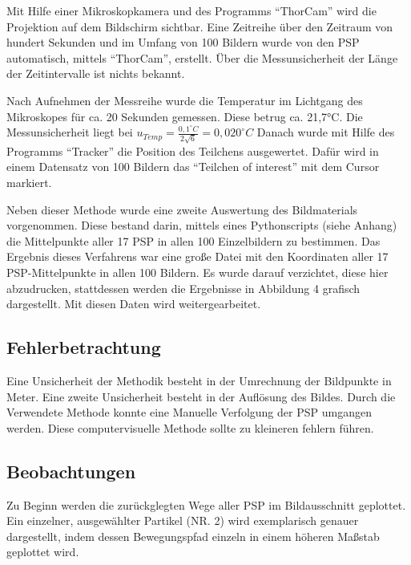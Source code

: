 \documentclass[
  9pt,
]{article}
\begin{document}
Mit Hilfe einer Mikroskopkamera und des Programms ``ThorCam'' wird die
Projektion auf dem Bildschirm sichtbar. Eine Zeitreihe über den Zeitraum
von hundert Sekunden und im Umfang von 100 Bildern wurde von den PSP
automatisch, mittels ``ThorCam'', erstellt. Über die Messunsicherheit
der Länge der Zeitintervalle ist nichts bekannt.

Nach Aufnehmen der Messreihe wurde die Temperatur im Lichtgang des
Mikroskopes für ca. 20 Sekunden gemessen. Diese betrug ca. 21,7°C. Die
Messunsicherheit liegt bei
\(u_{Temp}=\frac{0,1^{\circ}C}{2\sqrt{6}}= 0,020^{\circ}C\) Danach wurde
mit Hilfe des Programms ``Tracker'' die Position des Teilchens
ausgewertet. Dafür wird in einem Datensatz von 100 Bildern das
``Teilchen of interest'' mit dem Cursor markiert.

Neben dieser Methode wurde eine zweite Auswertung des Bildmaterials
vorgenommen. Diese bestand darin, mittels eines Pythonscripts (siehe
Anhang) die Mittelpunkte aller 17 PSP in allen 100 Einzelbildern zu
bestimmen. Das Ergebnis dieses Verfahrens war eine große Datei mit den
Koordinaten aller 17 PSP-Mittelpunkte in allen 100 Bildern. Es wurde
darauf verzichtet, diese hier abzudrucken, stattdessen werden die
Ergebnisse in Abbildung 4 grafisch dargestellt. Mit diesen Daten wird
weitergearbeitet.

\hypertarget{fehlerbetrachtung}{%
\subsection{Fehlerbetrachtung}\label{fehlerbetrachtung}}

Eine Unsicherheit der Methodik besteht in der Umrechnung der Bildpunkte
in Meter. Eine zweite Unsicherheit besteht in der Auflösung des Bildes.
Durch die Verwendete Methode konnte eine Manuelle Verfolgung der PSP
umgangen werden. Diese computervisuelle Methode sollte zu kleineren
fehlern führen.

\hypertarget{beobachtungen}{%
\subsection{Beobachtungen}\label{beobachtungen}}

Zu Beginn werden die zurückglegten Wege aller PSP im Bildausschnitt
geplottet. Ein einzelner, ausgewählter Partikel (NR. 2) wird
exemplarisch genauer dargestellt, indem dessen Bewegungspfad einzeln in
einem höheren Maßstab geplottet wird.
\end{document}
